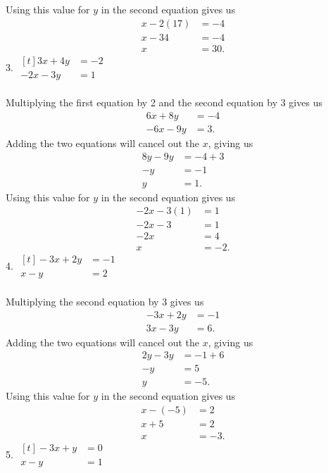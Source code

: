 \documentclass[12pt]{article}
\begin{document}
Using this value for $y$ in the second equation gives us
\begin{align*}
x-2(17)&=-4 \\
x-34&=-4 \\
x&=30.
\end{align*}
3. $\begin{aligned}[t]
3x+4y&=-2 \\
-2x-3y&=1
\end{aligned}$ \\
\\
Multiplying the first equation by 2 and the second equation by 3 gives us
\begin{align*}
6x+8y&=-4 \\
-6x-9y&=3.
\end{align*}
Adding the two equations will cancel out the $x$, giving us
\begin{align*}
8y-9y&=-4+3 \\
-y&=-1 \\
y&=1.
\end{align*}
Using this value for $y$ in the second equation gives us
\begin{align*}
-2x-3(1)&=1 \\
-2x-3&=1 \\
-2x&=4 \\
x&=-2.
\end{align*}
4. $\begin{aligned}[t]
-3x+2y&=-1 \\
x-y&=2
\end{aligned}$ \\
\\
Multiplying the second equation by 3 gives us
\begin{align*}
-3x+2y&=-1 \\
3x-3y&=6.
\end{align*}
Adding the two equations will cancel out the $x$, giving us
\begin{align*}
2y-3y&=-1+6 \\
-y&=5 \\
y&=-5.
\end{align*}
Using this value for $y$ in the second equation gives us
\begin{align*}
x-(-5)&=2 \\
x+5&=2 \\
x&=-3.
\end{align*}
5. $\begin{aligned}[t]
-3x+y&=0 \\
x-y&=1
\end{aligned}$ \\
\end{document}
